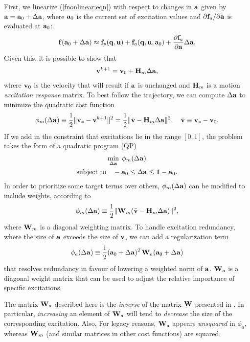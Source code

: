 First, we linearize (\ref{fnonlinear:eqn}) with respect to changes
in ${\bf a}$ given by ${\bf a} = {\bf a}_0 + \Delta {\bf a}$,
where ${\bf a}_0$ is the current set of excitation values and
$\partial {\bf f}_a/\partial {\bf a}$ is evaluated at ${\bf a}_0$:
%
\begin{equation}
{\bf f}({\bf a}_0 + \Delta {\bf a}) \approx
{\bf f}_p ({\bf q}, {\bf u}) + {\bf f}_a({\bf q}, {\bf u}, {\bf a}_0) + \frac{\partial {\bf f}_a}{\partial {\bf a}} \Delta {\bf a},
\label{flinearizeWrtA:eqn}	
\end{equation}
%
Given this, it is possible to show that
%
\begin{equation*}
{\bf v}^{k+1} = {\bf v}_0 + {\bf H}_m \Delta {\bf a},
\end{equation*}
%
where ${\bf v}_0$ is the velocity that will result if ${\bf a}$ is unchanged and ${\bf H}_m$ is a
motion {\it excitation response} matrix. To best follow the trajectory, we
can compute $\Delta {\bf a}$ to minimize the quadratic cost function
%
\begin{equation}
\phi_m(\Delta {\bf a}) \equiv \frac{1}{2} \| {\bf v}_* - {\bf v}^{k+1} \|^2 = 
\frac{1}{2} \| \bar{{\bf v}} - {\bf H}_m \Delta {\bf a} \|^2, \quad
\bar{{\bf v}} \equiv {\bf v}_* - {\bf v}_0.
\end{equation}
%
If we add in the constraint that excitations lie in the range $[0,
1]$, the problem takes the form of a quadratic program (QP)
%
\begin{gather}
\min_{\Delta {\bf a}} \; \phi_m(\Delta {\bf a}) \notag \\
\text{subject to} \quad -{\bf a}_0 \le \Delta {\bf a} \le {\bf 1} - {\bf a}_0.
\label{basicQP:eqn}
\end{gather}
%
In order to prioritize some target terms over others,
$\phi_m(\Delta {\bf a})$ can be modified to include weights, according to
%
\begin{equation}
\phi_m(\Delta {\bf a}) \equiv \frac{1}{2} \| {\bf W}_m (\bar{{\bf v}} - {\bf H}_m \Delta {\bf a}) \|^2,
\label{motionCostTerm:eqn}	
\end{equation}
%
where ${\bf W}_m$ is a diagonal weighting matrix.
%
To handle excitation redundancy, where the size of ${\bf a}$ exceeds the
size of ${\bf v}$, we can add a regularization term
%
\begin{equation}
\phi_a(\Delta {\bf a}) \equiv 
\frac{1}{2} ({\bf a}_0 + \Delta {\bf a})^T {\bf W}_a ({\bf a}_0 + \Delta {\bf a})
\label{regularizeCostTerm:eqn}	
\end{equation}
%
that resolves redundancy in favour of lowering a weighted norm of
${\bf a}$.  ${\bf W}_a$ is a diagonal weight matrix that can be used to adjust
the relative importance of specific excitations.

\begin{sideblock}
The matrix ${\bf W}_a$ described here is the {\it inverse} of the matrix ${\bf W}$
presented in \cite{lloyd2012artisynth}. In particular, {\it increasing} an
element of ${\bf W}_a$ will tend to {\it decrease} the size of the corresponding
excitation.  Also, For legacy reasons, ${\bf W}_a$ appears {\it unsquared} in
$\phi_a$, whereas ${\bf W}_m$ (and similar matrices in other cost functions) are
squared.
\end{sideblock}

